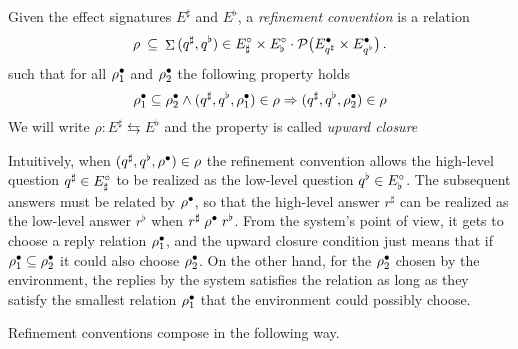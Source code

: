 \documentclass[acmsmall,review,anonymous]{acmart}\settopmatter{printfolios=true,printccs=false,printacmref=false}
\newcommand{\bdot}{\cdot}
\begin{document}
\begin{definition}
Given the effect signatures $E^\sharp$ and $E^\flat$,
a \emph{refinement convention} is a relation
\[
  \rho \:\subseteq\:
  \mathop\Sigma {(q^\sharp, q^\flat) \in E_\sharp^\que \times E_\flat^\que} \bdot
  \mathcal{P} \big( E_{q^\sharp}^\ans \times E_{q^\flat}^\ans \big) \,.
\]
such that for all $\rho^\bullet_1$ and $\rho^\bullet_2$
the following property holds
\[
  \rho^\bullet_1 \subseteq \rho^\bullet_2
  \wedge
  (q^\sharp, q^\flat, \rho^\bullet_1) \in \rho
  \Rightarrow
  (q^\sharp, q^\flat, \rho^\bullet_2) \in \rho
\]
We will write $\rho : E^\sharp \leftrightarrows E^\flat$
and the property is called \emph{upward closure}
\end{definition}

Intuitively,
when $(q^\sharp, q^\flat, \rho^\bullet) \in \rho$
the refinement convention allows
the high-level question $q^\sharp \in E^\circ_\sharp$ to be realized as
the low-level question $q^\flat \in E^\circ_\flat$.
The subsequent answers must be related by $\rho^\bullet$, so that
the high-level answer $r^\sharp$ %
can be realized as
the low-level answer $r^\flat$ %
when $r^\sharp \mathrel{\rho^\bullet} r^\flat$.
From the system's point of view,
it gets to choose a reply relation $\rho^\bullet_1$,
and the upward closure condition just means
that if $\rho^\bullet_1 \subseteq \rho^\bullet_2$
it could also choose $\rho^\bullet_2$.
On the other hand,
for the $\rho^\bullet_2$ chosen by the environment,
the replies by the system
satisfies the relation
as long as they satisfy the smallest relation
$\rho^\bullet_1$ that the environment could possibly choose.

Refinement conventions compose in the following way.
\end{document}
